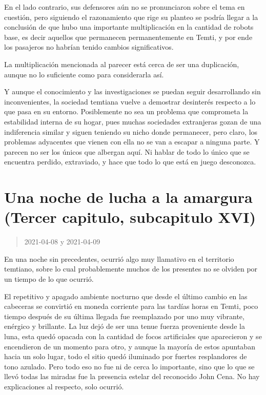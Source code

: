 \documentclass[
  spanish,
]{book}
\begin{document}
En el lado contrario, sus defensores aún no se pronunciaron sobre el tema en cuestión, pero siguiendo el razonamiento que rige su planteo se podría llegar a la conclusión de que hubo una importante multiplicación en la cantidad de robots base, es decir aquellos que permanecen permanentemente en Temti, y por ende los pasajeros no habrían tenido cambios significativos.

La multiplicación mencionada al parecer está cerca de ser una duplicación, aunque no lo suficiente como para considerarla así.

Y aunque el conocimiento y las investigaciones se puedan seguir desarrollando sin inconvenientes, la sociedad temtiana vuelve a demostrar desinterés respecto a lo que pasa en su entorno. Posiblemente no sea un problema que comprometa la estabilidad interna de su hogar, pues muchas sociedades extranjeras gozan de una indiferencia similar y siguen teniendo su nicho donde permanecer, pero claro, los problemas adyacentes que vienen con ella no se van a escapar a ninguna parte. Y parecen no ser los únicos que albergan aquí. Ni hablar de todo lo único que se encuentra perdido, extraviado, y hace que todo lo que está en juego desconozca.

\hypertarget{una-noche-de-lucha-a-la-amargura-tercer-capitulo-subcapitulo-xvi}{%
\section{Una noche de lucha a la amargura (Tercer capitulo, subcapitulo XVI)}\label{una-noche-de-lucha-a-la-amargura-tercer-capitulo-subcapitulo-xvi}}

\begin{quote}
2021-04-08 y 2021-04-09
\end{quote}

En una noche sin precedentes, ocurrió algo muy llamativo en el territorio temtiano, sobre lo cual probablemente muchos de los presentes no se olviden por un tiempo de lo que ocurrió.

El repetitivo y apagado ambiente nocturno que desde el último cambio en las cabeceras se convirtió en moneda corriente para las tardías horas en Temti, poco tiempo después de su última llegada fue reemplazado por uno muy vibrante, enérgico y brillante. La luz dejó de ser una tenue fuerza proveniente desde la luna, esta quedó opacada con la cantidad de focos artificiales que aparecieron y se encendieron de un momento para otro, y aunque la mayoría de estos apuntaban hacia un solo lugar, todo el sitio quedó iluminado por fuertes resplandores de tono azulado. Pero todo eso no fue ni de cerca lo importante, sino que lo que se llevó todas las miradas fue la presencia estelar del reconocido John Cena. No hay explicaciones al respecto, solo ocurrió.
\end{document}
